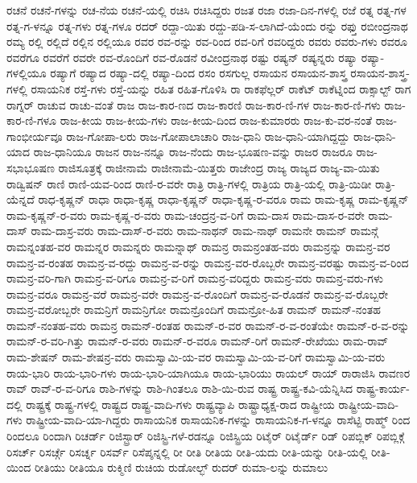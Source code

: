 {ರಚನೆ
ರಚನೆ-ಗಳನ್ನು
ರಚ-ನೆಯ
ರಚನೆ-ಯಲ್ಲಿ
ರಚಿಸಿ
ರಚಿಸಿದ್ದರು
ರಜತ
ರಜಾ
ರಜಾ-ದಿನ-ಗಳಲ್ಲಿ
ರಜೆ
ರತ್ನ
ರತ್ನ-ಗಳ
ರತ್ನ-ಗ-ಳನ್ನೂ
ರತ್ನ-ಗಳು
ರತ್ನ-ಗಳೂ
ರದರ್
ರದ್ದಾ-ಯಿತು
ರದ್ದು-ಪಡಿ-ಸ-ಲಾಗಿದೆ-ಯೆಂದು
ರನ್ನು
ರಫ್ತು
ರಬೀಂದ್ರನಾಥ
ರಮ್ಯ
ರಲ್ಲಿ
ರಲ್ಲಿದೆ
ರಲ್ಲಿನ
ರಲ್ಲಿಯೂ
ರವರ
ರವ-ರನ್ನು
ರವ-ರಿಂದ
ರವ-ರಿಗೆ
ರವರಿದ್ದರು
ರವರು
ರವರು-ಗಳು
ರವರೂ
ರವರೆಗೂ
ರವರೆಗೆ
ರವರೇ
ರವ-ರೊಂದಿಗೆ
ರವ-ರೊಡನೆ
ರವೀಂದ್ರನಾಥ
ರಷ್ಟು
ರಷ್ಯನ್
ರಷ್ಯನ್ನರು
ರಷ್ಯಾ
ರಷ್ಯಾ-ಗಳಲ್ಲಿಯೂ
ರಷ್ಯಾಗೆ
ರಷ್ಯಾದ
ರಷ್ಯಾ-ದಲ್ಲಿ
ರಷ್ಯಾ-ದಿಂದ
ರಸಂ
ರಸಗುಲ್ಲ
ರಸಾಯನ
ರಸಾಯನ-ಶಾಸ್ತ್ರ
ರಸಾಯನ-ಶಾಸ್ತ್ರ-ಗಳಲ್ಲಿ
ರಸಾಯನಿಕ
ರಸ್ತೆ-ಗಳು
ರಸ್ತೆ-ಯನ್ನು
ರಹಿತ
ರಹಿತ-ಗೊಳಿಸಿ
ರಾ
ರಾಕಫೆಲ್ಲರ್
ರಾಕೆಟ್
ರಾಕೆಟ್ನಿಂದ
ರಾಕ್ಸಾಲ್ಟ್
ರಾಗ
ರಾಗ್ನರ್
ರಾಚುವ
ರಾಚು-ವಂತೆ
ರಾಜ
ರಾಜ-ಕಾರ-ಣದ
ರಾಜ-ಕಾರಣಿ
ರಾಜ-ಕಾರ-ಣಿ-ಗಳ
ರಾಜ-ಕಾರ-ಣಿ-ಗಳು
ರಾಜ-ಕಾರ-ಣಿ-ಗಳೂ
ರಾಜ-ಕೀಯ
ರಾಜ-ಕೀಯ-ಗಳು
ರಾಜ-ಕೀಯ-ದಿಂದ
ರಾಜ-ಕುಮಾರರು
ರಾಜ-ಕು-ವರ-ನಂತೆ
ರಾಜ-ಗಾಂಭೀರ್ಯವೂ
ರಾಜ-ಗೋಪಾ-ಲರು
ರಾಜ-ಗೋಪಾಲಾಚಾರಿ
ರಾಜ-ಧಾನಿ
ರಾಜ-ಧಾನಿ-ಯಾಗಿದ್ದದ್ದು
ರಾಜ-ಧಾನಿ-ಯಾದ
ರಾಜ-ಧಾನಿಯೂ
ರಾಜನ
ರಾಜ-ನನ್ನೂ
ರಾಜ-ನೆಂದು
ರಾಜ-ಭೂಷಣ-ವನ್ನು
ರಾಜರ
ರಾಜರೂ
ರಾಜ-ಸಭಾಭೂಷಣ
ರಾಜಿಸೂತ್ರಕ್ಕೆ
ರಾಜೀನಾಮೆ
ರಾಜೀನಾಮೆ-ಯಿತ್ತರು
ರಾಜೇಂದ್ರ
ರಾಜ್ಯ
ರಾಜ್ಯದ
ರಾಜ್ಯ-ವಾ-ಯಿತು
ರಾಡ್ವಿಷನ್
ರಾಣಿ
ರಾಣಿ-ಯವ-ರಿಂದ
ರಾಣಿ-ರ-ವರೇ
ರಾತ್ರಿ
ರಾತ್ರಿ-ಗಳಲ್ಲಿ
ರಾತ್ರಿಯ
ರಾತ್ರಿ-ಯಲ್ಲಿ
ರಾತ್ರಿ-ಯಿಡೀ
ರಾತ್ರಿ-ಯೆನ್ನದೆ
ರಾಧ-ಕೃಷ್ಣನ್
ರಾಧಾ
ರಾಧಾ-ಕೃಷ್ಣ
ರಾಧಾ-ಕೃಷ್ಣನ್
ರಾಧಾ-ಕೃಷ್ಣ-ರ-ವರೂ
ರಾಮ
ರಾಮ-ಕೃಷ್ಣ
ರಾಮ-ಕೃಷ್ಣನ್
ರಾಮ-ಕೃಷ್ಣನ್-ರ-ವರು
ರಾಮ-ಕೃಷ್ಣ-ರ-ವರು
ರಾಮ-ಚಂದ್ರನ್ರ-ವ-ರಿಗೆ
ರಾಮ-ದಾಸ
ರಾಮ-ದಾಸ-ರ-ವರೇ
ರಾಮ-ದಾಸ್
ರಾಮ-ದಾಸ್ರ-ವರು
ರಾಮ-ದಾಸ್-ರ-ವರು
ರಾಮ-ನಾಥನ್
ರಾಮ-ನಾಥ್
ರಾಮನೇ
ರಾಮನ್
ರಾಮನ್ಗೆ
ರಾಮನ್ನಂತಹ-ವರ
ರಾಮನ್ನರ
ರಾಮನ್ನರು
ರಾಮನ್ನಾಥ್
ರಾಮನ್ರ
ರಾಮನ್ರಂತಹ-ವರು
ರಾಮನ್ರನ್ನು
ರಾಮನ್ರ-ವರ
ರಾಮನ್ರ-ವ-ರಂತಹ
ರಾಮನ್ರ-ವ-ರದ್ದು
ರಾಮನ್ರ-ವ-ರನ್ನು
ರಾಮನ್ರ-ವರ-ರೊಬ್ಬರೇ
ರಾಮನ್ರ-ವರಷ್ಟು
ರಾಮನ್ರ-ವ-ರಿಂದ
ರಾಮನ್ರ-ವರಿ-ಗಾಗಿ
ರಾಮನ್ರ-ವ-ರಿಗೂ
ರಾಮನ್ರ-ವ-ರಿಗೆ
ರಾಮನ್ರ-ವರಿದ್ದರು
ರಾಮನ್ರ-ವರು
ರಾಮನ್ರ-ವರು-ಗಳು
ರಾಮನ್ರ-ವರೂ
ರಾಮನ್ರ-ವರೆ
ರಾಮನ್ರ-ವರೇ
ರಾಮನ್ರ-ವ-ರೊಂದಿಗೆ
ರಾಮನ್ರ-ವ-ರೊಡನೆ
ರಾಮನ್ರ-ವ-ರೊಬ್ಬರೇ
ರಾಮನ್ರ-ವರೋಬ್ಬರೇ
ರಾಮನ್ರಿಗೆ
ರಾಮನ್ರಿಗೋ
ರಾಮನ್ರೊಂದಿಗೆ
ರಾಮನ್ರೋ-ಹಿತ
ರಾಮನ್
ರಾಮನ್-ನಂತಹ
ರಾಮನ್-ನಂತಹ-ವರು
ರಾಮನ್ರ
ರಾಮನ್-ರಂತಹ
ರಾಮನ್-ರ-ವರ
ರಾಮನ್-ರ-ವ-ರಂತೆಯೇ
ರಾಮನ್-ರ-ವ-ರನ್ನು
ರಾಮನ್-ರ-ವರಿ-ಗಿತ್ತು
ರಾಮನ್-ರ-ವರು
ರಾಮನ್-ರ-ವರೂ
ರಾಮನ್-ರಿಗೆ
ರಾಮನ್-ರೇಖೆಯು
ರಾಮ-ರಾವ್
ರಾಮ-ಶೇಷನ್
ರಾಮ-ಶೇಷನ್ರ-ವರು
ರಾಮಸ್ವಾಮಿ-ಯ-ವರ
ರಾಮಸ್ವಾಮಿ-ಯ-ವ-ರಿಗೆ
ರಾಮಸ್ವಾಮಿ-ಯ-ವರು
ರಾಯ-ಭಾರಿ
ರಾಯ-ಭಾರಿ-ಗಳು
ರಾಯ-ಭಾರಿ-ಯಾಗಿಯೂ
ರಾಯ-ಭಾರಿಯು
ರಾಯಲ್
ರಾಯ್
ರಾರಾಜಿಸಿ
ರಾವಣರ
ರಾವ್
ರಾವ್-ರ-ವ-ರಿಗೂ
ರಾಶಿ-ಗಳನ್ನು
ರಾಶಿ-ಗಿಂತಲೂ
ರಾಶಿ-ಯಿ-ರುವ
ರಾಷ್ಟ್ರ
ರಾಷ್ಟ್ರ-ಕವಿ-ಯೆನ್ನಿಸಿದ
ರಾಷ್ಟ್ರ-ಕಾರ್ಯ-ದಲ್ಲಿ
ರಾಷ್ಟ್ರಕ್ಕೆ
ರಾಷ್ಟ್ರ-ಗಳಲ್ಲಿ
ರಾಷ್ಟ್ರದ
ರಾಷ್ಟ್ರ-ವಾದಿ-ಗಳು
ರಾಷ್ಟ್ರವ್ಯಾಪಿ
ರಾಷ್ಟ್ರಾಧ್ಯಕ್ಷ-ರಾದ
ರಾಷ್ಟ್ರೀಯ
ರಾಷ್ಟ್ರೀಯ-ವಾದಿ-ಗಳು
ರಾಷ್ಟ್ರೀಯ-ವಾದಿ-ಯಾ-ಗಿದ್ದರು
ರಾಸಾಯನಿಕ
ರಾಸಾಯನಿಕ-ಗಳನ್ನು
ರಾಸಾಯನಿಕ-ಗ-ಳನ್ನೂ
ರಾಸೆಟ್ಟಿ
ರಾಹ್ಮ್
ರಿಂದ
ರಿಂದಲೂ
ರಿಂದಾಗಿ
ರಿಚರ್ಡ್
ರಿಜಿಸ್ಟ್ರಾರ್
ರಿಜಿಸ್ಟ್ರಿ-ಗಳೆ-ರಡನ್ನೂ
ರಿಜಿಸ್ಟ್ರಿಯ
ರಿಟೈರ್
ರಿಟೈರ್ಡ್
ರಿಡ್
ರಿಪಬ್ಲಿಕ್
ರಿಪಬ್ಲಿಕ್ಗೆ
ರಿಸರ್ಚ್
ರಿಸರ್ಚ್ಗೆ
ರಿಸರ್ಚ್ನ
ರಿಸರ್ವ್
ರಿಸೆಪ್ಶನ್ನಲ್ಲಿ
ರೀ
ರೀತಿ
ರೀತಿಯ
ರೀತಿ-ಯದು
ರೀತಿ-ಯನ್ನು
ರೀತಿ-ಯಲ್ಲಿ
ರೀತಿ-ಯಿಂದ
ರೀತಿಯು
ರೀತಿಯೂ
ರುಕ್ಮಿಣಿ
ರುಚಿಯ
ರುಡೋಲ್ಭ್
ರುದರ್
ರುಮಾ-ಲನ್ನು
ರುಮಾಲು
}
